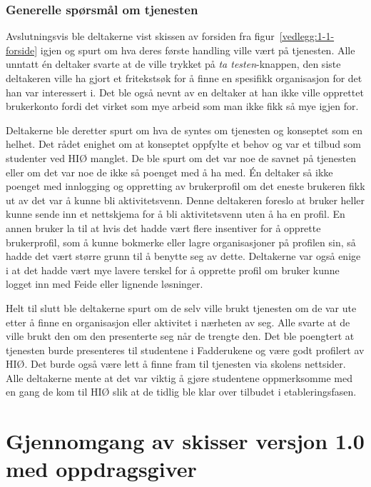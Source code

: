 \subsubsection{Generelle spørsmål om tjenesten}

Avslutningsvis ble deltakerne vist skissen av forsiden fra figur~\ref{vedlegg:1-1-forside} igjen og spurt om hva deres første handling ville vært på tjenesten. Alle unntatt én deltaker svarte at de ville trykket på {\em  ta testen}-knappen, den siste deltakeren ville ha gjort et fritekstsøk for å finne en spesifikk organisasjon for det han var interessert i. Det ble også nevnt av en deltaker at han ikke ville opprettet brukerkonto fordi det virket som mye arbeid som man ikke fikk så mye igjen for.

Deltakerne ble deretter spurt om hva de syntes om tjenesten og konseptet som en helhet. Det rådet enighet om at konseptet oppfylte et behov og var et tilbud som studenter ved HIØ manglet. De ble spurt om det var noe de savnet på tjenesten eller om det var noe de ikke så poenget med å ha med. Én deltaker så ikke poenget med innlogging og oppretting av brukerprofil om det eneste brukeren fikk ut av det var å kunne bli aktivitetsvenn. Denne deltakeren foreslo at bruker heller kunne sende inn et nettskjema for å bli aktivitetsvenn uten å ha en profil. En annen bruker la til at hvis det hadde vært flere insentiver for å opprette brukerprofil, som å kunne bokmerke eller lagre organisasjoner på profilen sin, så hadde det vært større grunn til å benytte seg av dette. Deltakerne var også enige i at det hadde vært mye lavere terskel for å opprette profil om bruker kunne logget inn med Feide eller lignende løsninger.

Helt til slutt ble deltakerne spurt om de selv ville brukt tjenesten om de var ute etter å finne en organisasjon eller aktivitet i nærheten av seg. Alle svarte at de ville brukt den om den presenterte seg når de trengte den. Det ble poengtert at tjenesten burde presenteres til studentene i Fadderukene og være godt profilert av HIØ. Det burde også være lett å finne fram til tjenesten via skolens nettsider. Alle deltakerne mente at det var viktig å gjøre studentene oppmerksomme med en gang de kom til HIØ slik at de tidlig ble klar over tilbudet i etableringsfasen.

\section{Gjennomgang av skisser versjon 1.0 med oppdragsgiver}
\label{section:skisser1.0-oppdragsgiver}

